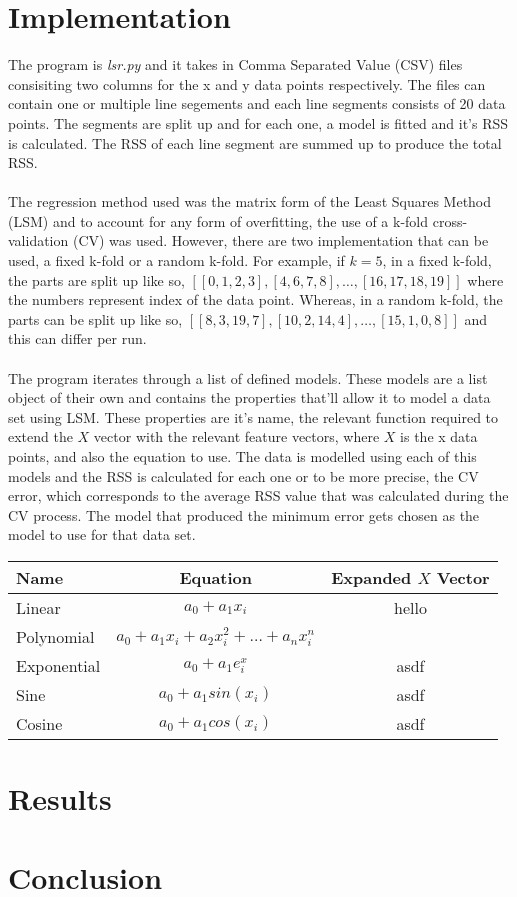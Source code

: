\documentclass[a4paper,11pt]{article}
\begin{document}
\section{Implementation}
The program is \emph{lsr.py} and it takes in Comma Separated Value (CSV) files
consisiting two columns for the x and y data points respectively. The files can
contain one or multiple line segements and each line segments consists of 20
data points. The segments are split up and for each one, a model is fitted
and it's RSS is calculated. The RSS of each line segment are summed up to
produce the total RSS.
\\ \\
The regression method used was the matrix form of the Least Squares Method (LSM)
and to account for any form of overfitting, the use of a k-fold cross-validation (CV)
was used. However, there are two implementation that can be used, a fixed k-fold
or a random k-fold. For example, if $k = 5$, in a fixed k-fold, the parts are split up
like so, $[[0, 1, 2, 3], [4, 6, 7, 8], \dots, [16, 17, 18, 19]]$ where the
numbers represent index of the data point. Whereas, in a random k-fold, the parts
can be split up like so, $[[8, 3, 19, 7], [10, 2, 14, 4], \dots, [15, 1, 0, 8]]$
and this can differ per run. 
\\ \\
The program iterates through a list of defined models. These models are a list
object of their own and contains the properties that'll allow it to model a
data set using LSM. These properties are it's name, the relevant function required
to extend the $X$ vector with the relevant feature vectors, where $X$ is the x
data points, and also the equation to use. The data is modelled using each of this models
and the RSS is calculated for each one or to be more precise, the CV error, which
corresponds to the average RSS value that was calculated during the CV process.
The model that produced the minimum error gets chosen as the model to use for
that data set.

\begin{center}
    \begin{tabular}{l c c}
        \toprule
        \textbf{Name} & \textbf{Equation} & \textbf{Expanded $X$ Vector} \\
        \midrule
        Linear
            & $a_0 + a_1x_i$
            & hello
            \\
        Polynomial
            & $a_0 + a_1x_i + a_2x_i^2 + \dots + a_nx_i^n$
            &
            \\
        Exponential
            & $a_0 + a_1e^x_i$
            & asdf
            \\
        Sine
            & $a_0 + a_1sin(x_i)$
            & asdf
            \\
        Cosine
            & $a_0 + a_1cos(x_i)$
            & asdf
            \\
        \bottomrule
    \end{tabular}
\end{center}

\section{Results}

\section{Conclusion}
\end{document}
